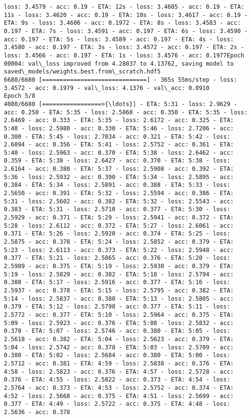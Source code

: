 \documentclass[11pt]{article}
\begin{document}
\begin{Verbatim}[commandchars=\\\{\}]
loss: 3.4579 - acc: 0.19 - ETA: 12s - loss: 3.4605 - acc: 0.19 - ETA: 11s - loss: 3.4620 - acc: 0.19 - ETA: 10s - loss: 3.4617 - acc: 0.19 - ETA: 9s - loss: 3.4606 - acc: 0.1972 - ETA: 8s - loss: 3.4583 - acc: 0.197 - ETA: 7s - loss: 3.4591 - acc: 0.197 - ETA: 6s - loss: 3.4590 - acc: 0.197 - ETA: 5s - loss: 3.4589 - acc: 0.197 - ETA: 4s - loss: 3.4580 - acc: 0.197 - ETA: 3s - loss: 3.4572 - acc: 0.197 - ETA: 2s - loss: 3.4566 - acc: 0.197 - ETA: 1s - loss: 3.4576 - acc: 0.1977Epoch 00004: val\_loss improved from 4.28037 to 4.13762, saving model to saved\_models/weights.best.from\_scratch.hdf5
6680/6680 [==============================] - 365s 55ms/step - loss: 3.4572 - acc: 0.1979 - val\_loss: 4.1376 - val\_acc: 0.0910
Epoch 5/8
4080/6680 [=================>{\ldots}] - ETA: 5:31 - loss: 2.9629 - acc: 0.250 - ETA: 5:35 - loss: 2.5860 - acc: 0.350 - ETA: 5:35 - loss: 2.6469 - acc: 0.333 - ETA: 5:35 - loss: 2.6172 - acc: 0.325 - ETA: 5:40 - loss: 2.5980 - acc: 0.330 - ETA: 5:46 - loss: 2.7206 - acc: 0.300 - ETA: 5:45 - loss: 2.7034 - acc: 0.321 - ETA: 5:42 - loss: 2.6094 - acc: 0.356 - ETA: 5:41 - loss: 2.5752 - acc: 0.361 - ETA: 5:40 - loss: 2.5963 - acc: 0.370 - ETA: 5:38 - loss: 2.6462 - acc: 0.359 - ETA: 5:38 - loss: 2.6427 - acc: 0.370 - ETA: 5:38 - loss: 2.6164 - acc: 0.380 - ETA: 5:37 - loss: 2.5908 - acc: 0.392 - ETA: 5:36 - loss: 2.5932 - acc: 0.390 - ETA: 5:34 - loss: 2.5895 - acc: 0.384 - ETA: 5:34 - loss: 2.5891 - acc: 0.388 - ETA: 5:33 - loss: 2.5650 - acc: 0.391 - ETA: 5:32 - loss: 2.5594 - acc: 0.386 - ETA: 5:31 - loss: 2.5602 - acc: 0.382 - ETA: 5:32 - loss: 2.5543 - acc: 0.383 - ETA: 5:31 - loss: 2.5710 - acc: 0.377 - ETA: 5:30 - loss: 2.5929 - acc: 0.371 - ETA: 5:29 - loss: 2.5941 - acc: 0.372 - ETA: 5:28 - loss: 2.6112 - acc: 0.372 - ETA: 5:27 - loss: 2.6061 - acc: 0.371 - ETA: 5:26 - loss: 2.5920 - acc: 0.374 - ETA: 5:25 - loss: 2.5875 - acc: 0.378 - ETA: 5:24 - loss: 2.5852 - acc: 0.379 - ETA: 5:23 - loss: 2.6113 - acc: 0.373 - ETA: 5:22 - loss: 2.5948 - acc: 0.377 - ETA: 5:21 - loss: 2.5865 - acc: 0.376 - ETA: 5:20 - loss: 2.5989 - acc: 0.375 - ETA: 5:19 - loss: 2.5930 - acc: 0.379 - ETA: 5:19 - loss: 2.5829 - acc: 0.382 - ETA: 5:18 - loss: 2.5794 - acc: 0.380 - ETA: 5:17 - loss: 2.5916 - acc: 0.377 - ETA: 5:16 - loss: 2.5937 - acc: 0.378 - ETA: 5:15 - loss: 2.5795 - acc: 0.382 - ETA: 5:14 - loss: 2.5837 - acc: 0.380 - ETA: 5:13 - loss: 2.5805 - acc: 0.379 - ETA: 5:12 - loss: 2.5798 - acc: 0.377 - ETA: 5:11 - loss: 2.5772 - acc: 0.377 - ETA: 5:10 - loss: 2.5964 - acc: 0.375 - ETA: 5:09 - loss: 2.5923 - acc: 0.376 - ETA: 5:08 - loss: 2.5832 - acc: 0.378 - ETA: 5:07 - loss: 2.5746 - acc: 0.380 - ETA: 5:05 - loss: 2.5618 - acc: 0.382 - ETA: 5:04 - loss: 2.5623 - acc: 0.379 - ETA: 5:04 - loss: 2.5742 - acc: 0.378 - ETA: 5:03 - loss: 2.5709 - acc: 0.380 - ETA: 5:02 - loss: 2.5684 - acc: 0.380 - ETA: 5:00 - loss: 2.5712 - acc: 0.381 - ETA: 4:59 - loss: 2.5838 - acc: 0.376 - ETA: 4:58 - loss: 2.5823 - acc: 0.376 - ETA: 4:57 - loss: 2.5728 - acc: 0.376 - ETA: 4:55 - loss: 2.5822 - acc: 0.373 - ETA: 4:54 - loss: 2.5764 - acc: 0.373 - ETA: 4:53 - loss: 2.5752 - acc: 0.374 - ETA: 4:52 - loss: 2.5668 - acc: 0.375 - ETA: 4:51 - loss: 2.5699 - acc: 0.377 - ETA: 4:49 - loss: 2.5722 - acc: 0.375 - ETA: 4:48 - loss: 2.5636 - acc: 0.378 
\end{Verbatim}
\end{document}
